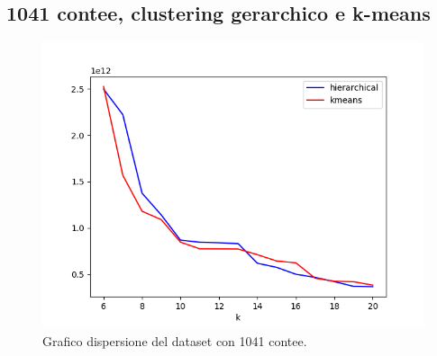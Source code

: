 \documentclass{article}
\begin{document}
\subsection*{1041 contee, clustering gerarchico e k-means }
\begin{figure}[H]
	\hspace*{-1cm}\begin{minipage}{0.55\linewidth}
		\centering
			
	\end{minipage}
	\begin{minipage}{0.7\linewidth}
		\includegraphics[width=1.0\linewidth, valign=t]{figures/output1041}
		\caption*{Grafico dispersione del dataset con 1041 contee.}

	\end{minipage}
\end{figure}
\end{document}
